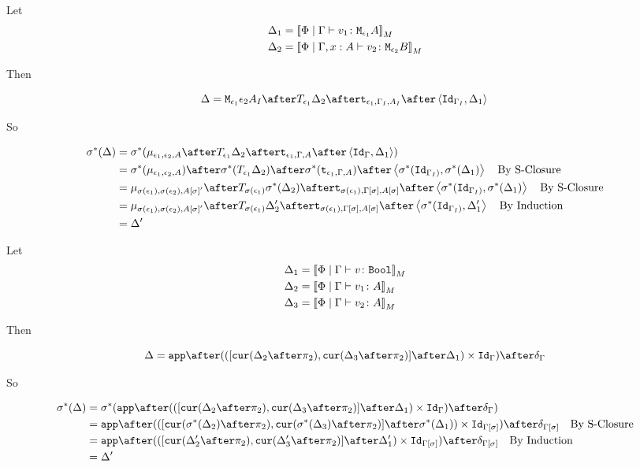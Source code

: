 \documentclass{report}
\begin{document}
Let \begin{align}
    \Delta_1 &= {\bf [\![}\Phi\mid\Gamma \vdash v_1 \colon \texttt{M}_{\epsilon_1}{A}{\bf ]\!]}_M\\
    \Delta_2 &= {\bf [\![}\Phi\mid\Gamma, x: A \vdash v_2 \colon \texttt{M}_{\epsilon_2}{B}{\bf ]\!]}_M
\end{align}

Then

\begin{equation}
    \D = \M{\e_1}{\e_2}{A_I}\after\T{\e_1}{\D_2}\after\tstrength{\e_1}{\G_I}{A_I}\after\pr{\Id{\G_{I}}}{\D_1}\\
\end{equation}

So

\begin{align}
    \si\star(\D) &= \si\star(\bind{\e_1}{\e_2}{A}\after\T{\e_1}{\D_2}\after\tstrength{\e_1}{\G}{A}\after\pr{\Id{\G}}{\D_1})\\
    & = \si\star(\bind{\e_1}{\e_2}{A})\after\si\star(\T{\e_1}{\D_2})\after\si\star(\tstrength{\e_1}{\G}{A})\after\pr{\si\star(\Id{\G_{I})}}{\si\star(\D_1)}\qt{By S-Closure}\\
    &= \bind{\si(\e_1)}{\si(\e_2)}{A\ssi'}\after\T{\si(\e_1)}{\si\star(\D_2)}\after\tstrength{\si(\e_1)}{\G\ssi}{A\ssi}\after\pr{\si\star(\Id{\G_{I})}}{\si\star(\D_1)}\qt{By S-Closure}\\
    &= \bind{\si(\e_1)}{\si(\e_2)}{A\ssi'}\after\T{\si(\e_1)}{\D_2'}\after\tstrength{\si(\e_1)}{\G\ssi}{A\ssi}\after\pr{\si\star(\Id{\G_{I})}}{\D_1'}\qt{By Induction}\\
    &= \D'\\
\end{align}


Let \begin{align}
    \Delta_1 &= {\bf [\![}\Phi\mid\Gamma \vdash v \colon \texttt{Bool}{\bf ]\!]}_M\\
    \Delta_2 &= {\bf [\![}\Phi\mid\Gamma \vdash v_1 \colon A{\bf ]\!]}_M\\
    \Delta_3 &= {\bf [\![}\Phi\mid\Gamma \vdash v_2 \colon A{\bf ]\!]}_M\\
\end{align}

Then

\begin{equation}
    \D = \app\after(([\cur{\D_2\after\pp}, \cur{\D_3\after\pp}]\after\D_1)\times\Id{\G})\after\diag{\G}\\
\end{equation}

So

\begin{align}
    \si\star(\D) &= \si\star(\app\after(([\cur{\D_2\after\pp}, \cur{\D_3\after\pp}]\after\D_1)\times\Id{\G})\after\diag{\G})\\
    &= \app\after(([\cur{\si\star(\D_2)\after\pp}, \cur{\si\star(\D_3)\after\pp}]\after\si\star(\D_1))\times\Id{\G\ssi})\after\diag{\G\ssi}\qt{By S-Closure}\\
    &= \app\after(([\cur{\D_2'\after\pp}, \cur{\D_3'\after\pp}]\after\D_1')\times\Id{\G\ssi})\after\diag{\G\ssi}\qt{By Induction}\\
    & = \D'\\
\end{align}
\end{document}
